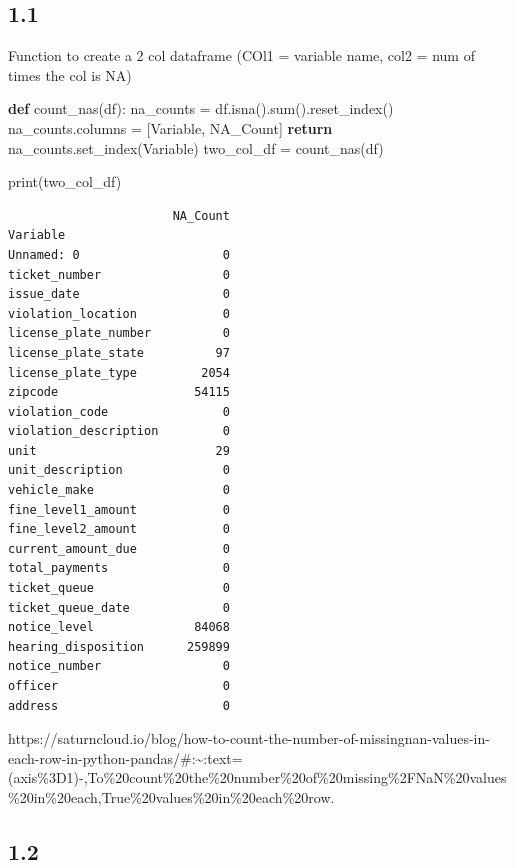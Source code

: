 \documentclass[
  letterpaper,
  DIV=11,
  numbers=noendperiod]{scrartcl}
\newenvironment{Shaded}{\begin{snugshade}}{\end{snugshade}}
\newcommand{\BuiltInTok}[1]{\textcolor[rgb]{0.00,0.23,0.31}{#1}}
\newcommand{\ControlFlowTok}[1]{\textcolor[rgb]{0.00,0.23,0.31}{\textbf{#1}}}
\newcommand{\KeywordTok}[1]{\textcolor[rgb]{0.00,0.23,0.31}{\textbf{#1}}}
\newcommand{\NormalTok}[1]{\textcolor[rgb]{0.00,0.23,0.31}{#1}}
\newcommand{\OperatorTok}[1]{\textcolor[rgb]{0.37,0.37,0.37}{#1}}
\newcommand{\StringTok}[1]{\textcolor[rgb]{0.13,0.47,0.30}{#1}}
\begin{document}
\subsection{1.1}\label{section}

Function to create a 2 col dataframe (COl1 = variable name, col2 = num
of times the col is NA)

\begin{Shaded}
\begin{Highlighting}[]
\KeywordTok{def}\NormalTok{ count\_nas(df):}
\NormalTok{    na\_counts }\OperatorTok{=}\NormalTok{ df.isna().}\BuiltInTok{sum}\NormalTok{().reset\_index()}
\NormalTok{    na\_counts.columns }\OperatorTok{=}\NormalTok{ [}\StringTok{\textquotesingle{}Variable\textquotesingle{}}\NormalTok{, }\StringTok{\textquotesingle{}NA\_Count\textquotesingle{}}\NormalTok{]}
    \ControlFlowTok{return}\NormalTok{ na\_counts.set\_index(}\StringTok{\textquotesingle{}Variable\textquotesingle{}}\NormalTok{)}
\NormalTok{two\_col\_df }\OperatorTok{=}\NormalTok{ count\_nas(df)}

\BuiltInTok{print}\NormalTok{(two\_col\_df)}
\end{Highlighting}
\end{Shaded}

\begin{verbatim}
                       NA_Count
Variable                       
Unnamed: 0                    0
ticket_number                 0
issue_date                    0
violation_location            0
license_plate_number          0
license_plate_state          97
license_plate_type         2054
zipcode                   54115
violation_code                0
violation_description         0
unit                         29
unit_description              0
vehicle_make                  0
fine_level1_amount            0
fine_level2_amount            0
current_amount_due            0
total_payments                0
ticket_queue                  0
ticket_queue_date             0
notice_level              84068
hearing_disposition      259899
notice_number                 0
officer                       0
address                       0
\end{verbatim}

https://saturncloud.io/blog/how-to-count-the-number-of-missingnan-values-in-each-row-in-python-pandas/\#:\textasciitilde:text=(axis\%3D1)-,To\%20count\%20the\%20number\%20of\%20missing\%2FNaN\%20values\%20in\%20each,True\%20values\%20in\%20each\%20row.

\subsection{1.2}\label{section-1}
\end{document}

